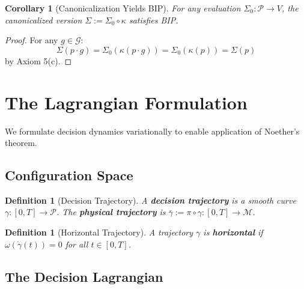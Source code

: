 \documentclass[11pt]{article}
\newtheorem{corollary}[theorem]{Corollary}
\newtheorem{definition}[theorem]{Definition}
\begin{document}
\begin{corollary}[Canonicalization Yields BIP]
For any evaluation $\Sigma_0 : \mathcal{P} \to V$, the
canonicalized version $\Sigma := \Sigma_0 \circ \kappa$ satisfies BIP.
\end{corollary}

\begin{proof}
For any $g \in \mathcal{G}$:
\[
\Sigma(p \cdot g) = \Sigma_0(\kappa(p \cdot g)) = \Sigma_0(\kappa(p)) = \Sigma(p)
\]
by Axiom 5(c).
\end{proof}

\section{The Lagrangian Formulation}

We formulate decision dynamics variationally to enable application of Noether's theorem.

\subsection{Configuration Space}

\begin{definition}[Decision Trajectory]
A \textbf{decision trajectory} is a smooth curve $\gamma : [0, T] \to \mathcal{P}$.
The \textbf{physical trajectory} is $\bar{\gamma} := \pi \circ \gamma : [0, T] \to \mathcal{M}$.
\end{definition}

\begin{definition}[Horizontal Trajectory]
A trajectory $\gamma$ is \textbf{horizontal} if $\omega(\dot{\gamma}(t)) = 0$ for all
$t \in [0, T]$.
\end{definition}

\subsection{The Decision Lagrangian}
\end{document}
